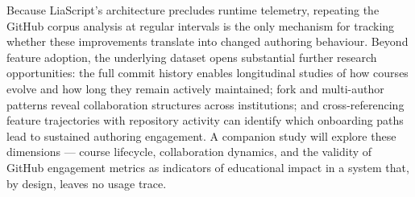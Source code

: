 Because LiaScript's architecture precludes runtime telemetry,
repeating the GitHub corpus analysis at regular intervals is the only
mechanism for tracking whether these improvements translate into changed
authoring behaviour.
Beyond feature adoption, the underlying dataset opens substantial
further research opportunities:
the full commit history enables longitudinal studies of how courses
evolve and how long they remain actively maintained;
fork and multi-author patterns reveal collaboration structures
across institutions;
and cross-referencing feature trajectories with repository activity
can identify which onboarding paths lead to sustained authoring
engagement.
A companion study will explore these dimensions --- course lifecycle,
collaboration dynamics, and the validity of GitHub engagement metrics
as indicators of educational impact in a system that, by design,
leaves no usage trace.
